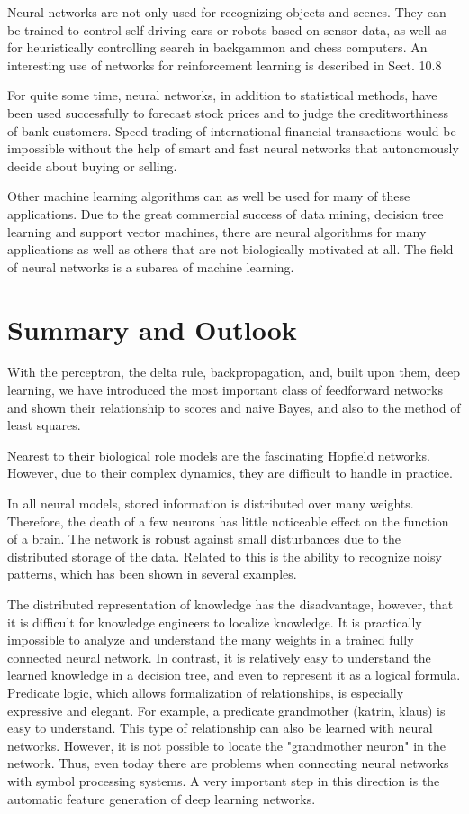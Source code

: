 \documentclass[10pt]{book}
\begin{document}
Neural networks are not only used for recognizing objects and scenes. They can be trained to control self driving cars or robots based on sensor data, as well as for heuristically controlling search in backgammon and chess computers. An interesting use of networks for reinforcement learning is described in Sect. 10.8

For quite some time, neural networks, in addition to statistical methods, have been used successfully to forecast stock prices and to judge the creditworthiness of bank customers. Speed trading of international financial transactions would be impossible without the help of smart and fast neural networks that autonomously decide about buying or selling.


Other machine learning algorithms can as well be used for many of these applications. Due to the great commercial success of data mining, decision tree learning and support vector machines, there are neural algorithms for many applications as well as others that are not biologically motivated at all. The field of neural networks is a subarea of machine learning.

\section{Summary and Outlook}
With the perceptron, the delta rule, backpropagation, and, built upon them, deep learning, we have introduced the most important class of feedforward networks and shown their relationship to scores and naive Bayes, and also to the method of least squares.

Nearest to their biological role models are the fascinating Hopfield networks. However, due to their complex dynamics, they are difficult to handle in practice.

In all neural models, stored information is distributed over many weights. Therefore, the death of a few neurons has little noticeable effect on the function of a brain. The network is robust against small disturbances due to the distributed storage of the data. Related to this is the ability to recognize noisy patterns, which has been shown in several examples.

The distributed representation of knowledge has the disadvantage, however, that it is difficult for knowledge engineers to localize knowledge. It is practically impossible to analyze and understand the many weights in a trained fully connected neural network. In contrast, it is relatively easy to understand the learned knowledge in a decision tree, and even to represent it as a logical formula. Predicate logic, which allows formalization of relationships, is especially expressive and elegant. For example, a predicate grandmother (katrin, klaus) is easy to understand. This type of relationship can also be learned with neural networks. However, it is not possible to locate the "grandmother neuron" in the network. Thus, even today there are problems when connecting neural networks with symbol processing systems. A very important step in this direction is the automatic feature generation of deep learning networks.
\end{document}
